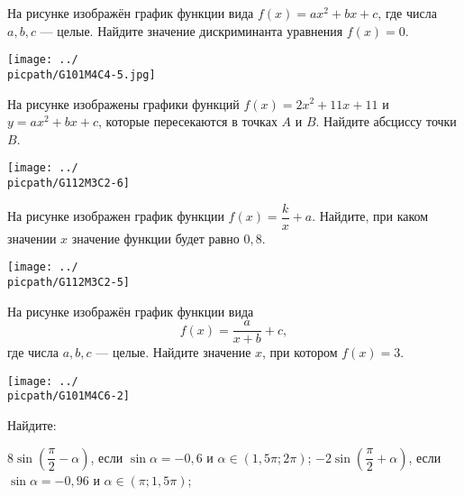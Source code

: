 \begin{class}[number=4]
\begin{listofex}
		\item
		\begin{minipage}[t]{\bodywidth}
			На рисунке изображён график функции вида \(f(x)=ax^2+bx+c\), где числа \(a, b, c\) --- целые. Найдите значение дискриминанта уравнения \(f(x)=0\).
		\end{minipage}
		\begin{minipage}[t]{\picwidth}
			\texttt{[image: ../\\picpath/G101M4C4-5.jpg]}
		\end{minipage}
		
		\item
		\begin{minipage}[t]{\bodywidth}
			На рисунке изображены графики функций \( f(x)=2x^2+11x+11 \) и \( y=ax^2+bx+c \), которые пересекаются в точках \( A \) и \( B \). Найдите абсциссу точки \( B \).
		\end{minipage}
		\begin{minipage}[t]{\picwidth}
			\texttt{[image: ../\\picpath/G112M3C2-6]}
		\end{minipage}
		\item
		\begin{minipage}[t]{\bodywidth}
			На рисунке изображен график функции \( f(x)=\dfrac{k}{x}+a \). Найдите, при каком значении \( x \) значение функции будет равно \( 0,8 \).
		\end{minipage}
		\begin{minipage}[t]{\picwidth}
			\texttt{[image: ../\\picpath/G112M3C2-5]}
		\end{minipage}
		\item
		\begin{minipage}[t]{\bodywidth}
			На рисунке изображён график функции вида \[ f(x)=\dfrac{a}{x+b}+c, \] где числа \(a, b, c\) --- целые. Найдите значение \(x\), при котором \(f(x)=3\).
		\end{minipage}
		\hspace{0.02\linewidth}
		\begin{minipage}[t]{\picwidth}
			\texttt{[image: ../\\picpath/G101M4C6-2]}
		\end{minipage}
		\newpage
		\item Найдите:
		\begin{tasks}
			\task \( 8 \sin \left( \dfrac{ \pi }{ 2 }- \alpha \right) \), если \( \sin \alpha = -0,6 \) и \( \alpha \in (1,5\pi;2\pi) \);
			\task \( -2 \sin \left( \dfrac{ \pi }{ 2 }+\alpha \right) \), если \( \sin \alpha = -0,96 \) и \( \alpha \in (\pi;1,5\pi) \);

\end{tasks}
\end{listofex}
\end{class}
